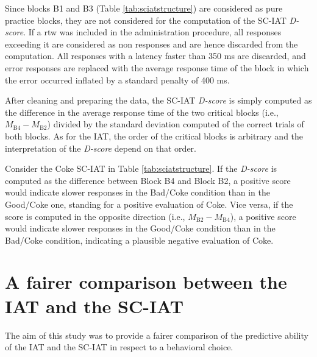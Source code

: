 \documentclass[12pt]{book}
\begin{document}
Since blocks B1 and B3 (Table \ref{tab:sciatstructure}) are considered as pure practice blocks, they are not considered for the computation of the SC-IAT \emph{D-score}. If a rtw was included in the administration procedure, all responses exceeding it are considered as non responses and are hence discarded from the computation. All responses with a latency faster than 350 ms are discarded, and error responses are replaced with the average response time of the block in which the error occurred inflated by a standard penalty of 400 ms. 

After cleaning and preparing the data, the SC-IAT \emph{D-score} is simply computed as the difference in the average response time of the two critical blocks (i.e., $M_{\text{B4}} - M_{\text{B2}}$) divided by the standard deviation computed of the correct trials of both blocks. As for the IAT, the order of the critical blocks is arbitrary and the interpretation of the \emph{D-score} depend on that order. 

Consider the Coke SC-IAT in Table \ref{tab:sciatstructure}. If the \emph{D-score} is computed as the difference between Block B4 and Block B2, a positive score would indicate slower responses in the Bad/Coke condition than in the Good/Coke one, standing for a positive evaluation of Coke. Vice versa, if the score is computed in the opposite direction (i.e., $M_{\text{B2}} - M_{\text{B4}}$), a positive score would indicate slower responses in the Good/Coke condition than in the Bad/Coke condition, indicating a plausible negative evaluation of Coke. 


\section[A fairer comparison]{A fairer comparison between the IAT and the SC-IAT}

The aim of this study was to provide a fairer comparison of the predictive ability of the IAT and the SC-IAT in respect to a behavioral choice. 
\end{document}
